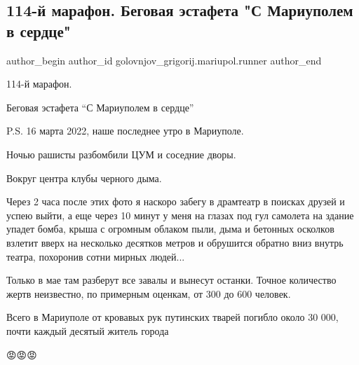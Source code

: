  
 
 
 
 

\subsection{114-й марафон.  Беговая эстафета "С Мариуполем в сердце"}
\label{sec:29_05_2022.fb.golovnjov_grigorij.mariupol.runner.1.114_i_marafon___bego}

\ifcmt
 author_begin
   author_id golovnjov_grigorij.mariupol.runner
 author_end
\fi


114-й марафон. 

Беговая эстафета \enquote{С Мариуполем в сердце}

P.S. 16 марта 2022, наше последнее утро в Мариуполе. 

Ночью рашисты разбомбили ЦУМ и соседние дворы. 

Вокруг центра клубы черного дыма. 

Через 2 часа после этих фото я наскоро забегу в драмтеатр в поисках друзей и
успею выйти, а еще через 10 минут у меня на глазах под гул самолета на здание
упадет бомба, крыша с огромным облаком пыли, дыма и бетонных осколков взлетит
вверх на несколько десятков метров и обрушится обратно вниз внутрь театра,
похоронив сотни мирных людей...

Только в мае там разберут все завалы и вынесут останки. Точное количество жертв
неизвестно, по примерным оценкам, от 300 до 600 человек. 

Всего в Мариуполе от кровавых рук путинских тварей погибло около 30 000, почти
каждый десятый житель города 

😡😡😡


